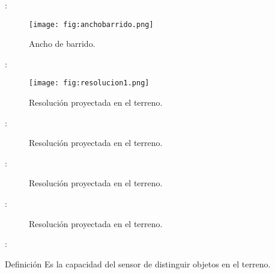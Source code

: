 \begin{frame}{\secname : \subsecname}
  \begin{figure}
    \centering
    \texttt{[image: fig:anchobarrido.png]}
    \caption{Ancho de barrido.}
    \label{}
  \end{figure}
\end{frame}

\begin{frame}{\secname : \subsecname}
  \begin{figure}
    \centering
    \texttt{[image: fig:resolucion1.png]}
    \caption{Resolución proyectada en el terreno.}
    \label{}
  \end{figure}
\end{frame}

\begin{frame}{\secname : \subsecname}
  \begin{figure}
    \centering
    \caption{Resolución proyectada en el terreno.}
    \label{}
  \end{figure}
\end{frame}

\begin{frame}{\secname : \subsecname}
  \begin{figure}
    \centering
    \caption{Resolución proyectada en el terreno.}
    \label{}
  \end{figure}
\end{frame}

\begin{frame}{\secname : \subsecname}
  \begin{figure}
    \centering
    \caption{Resolución proyectada en el terreno.}
    \label{}
  \end{figure}
\end{frame}

\begin{frame}{\secname : \subsecname}
    \begin{block}{Definición}
        Es la capacidad del sensor de distinguir objetos en el terreno.
    \end{block}
\end{frame}

